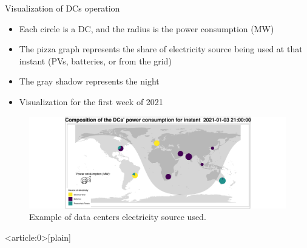 \documentclass[Ligatures=TeX,table,svgnames,usetotalslideindicator,compress,10pt,aspectratio=169]{beamer}
\begin{document}
\begin{frame}{Visualization of DCs operation}
  
  \begin{itemize}    
  \item Each circle is a DC, and the radius is the power consumption (MW)
  \item The pizza graph represents the share of electricity source being used at that instant (PVs, batteries, or from the grid)
  \item The gray shadow represents the night
  \item Visualization for the first week of 2021
  \end{itemize}
  
  \begin{center}
    \begin{figure}[!h]
      \centering
      \includegraphics[width=.8\textwidth]{images/dc_op_plot.png}
      \caption{Example of data centers electricity source used.}
    \end{figure}
  \end{center}
\end{frame}
\addtocounter{framenumber}{-1}



{ %
    \begin{frame}<article:0>[plain]
     \end{frame}
}
\end{document}
